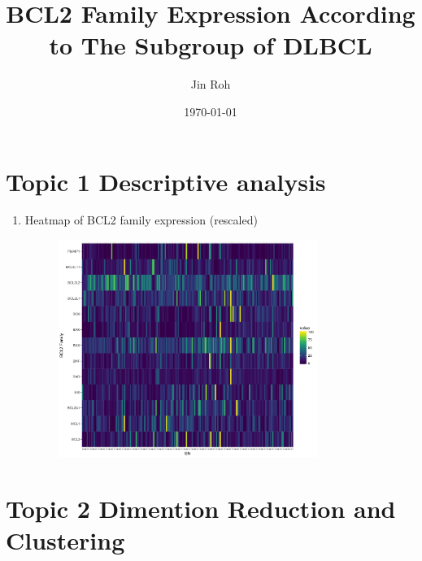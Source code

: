 \documentclass{article}
\title{BCL2 Family Expression According to The Subgroup of DLBCL}
\author{Jin Roh}
\date{\today}
\begin{document}
\maketitle

\section*{Topic 1 Descriptive analysis}

\begin{enumerate}
    \item Heatmap of BCL2 family expression (rescaled)
    
    \begin{figure}[H]
        \includegraphics[width = 0.8\textwidth, center]{Image/BCL2_Heatmap.jpg}
    \end{figure}
    
\end{enumerate}

\section*{Topic 2 Dimention Reduction and Clustering}
\end{document}
